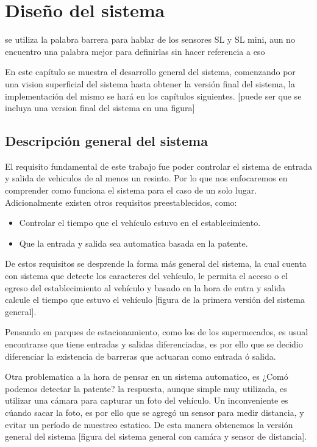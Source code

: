\chapter{Diseño del sistema}

 {\huge se utiliza la palabra barrera para hablar de los sensores SL y SL mini, aun no encuentro una palabra mejor para definirlas sin hacer referencia a eso}

En este capítulo se muestra el desarrollo general del sistema, comenzando por una vision superficial del sistema hasta obtener la versión final del sistema, la implementación del mismo se hará en los capítulos siguientes. [puede ser que se incluya una version final del sistema en una figura]
\section{Descripción general del sistema}

El requisito fundamental de este trabajo fue poder controlar el sistema de entrada y salida de vehiculos de al menos un resinto. Por lo que nos enfocaremos en comprender como funciona el sistema para el caso de un solo lugar. Adicionalmente existen otros requisitos preestablecidos, como:

\begin{itemize}
    \item Controlar el tiempo que el vehículo estuvo en el establecimiento.
    \item Que la entrada y salida sea automatica basada en la patente.
\end{itemize}

De estos requisitos se desprende la forma más general del sistema, la cual cuenta con sistema que detecte los caracteres del vehículo, le permita el acceso o el egreso del establecimiento al vehículo y basado en la hora de entra y salida calcule el tiempo que estuvo el vehículo [figura de la primera versión del sistema general].


Pensando en parques de estacionamiento, como los de los supermecados, es usual encontrarse que tiene entradas y salidas diferenciadas, es por ello que se decidio diferenciar la existencia de barreras que actuaran como entrada ó salida.

Otra problematica a la hora de pensar en un sistema automatico, es ¿Comó podemos detectar la patente? la respuesta, aunque simple muy utilizada, es utilizar una cámara para capturar un foto del vehículo. Un inconveniente es cúando sacar la foto, es por ello que se agregó un sensor para medir distancia, y evitar un período de muestreo estatico. De esta manera obtenemos la versión general del sistema [figura del sistema general con camára y sensor de distancia].


